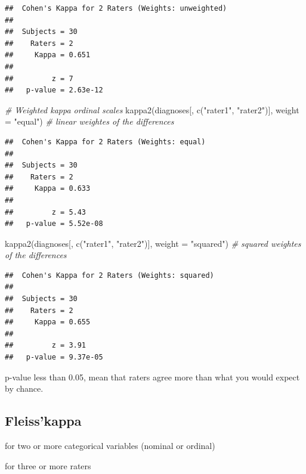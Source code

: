 \documentclass[
]{book}
\newenvironment{Shaded}{\begin{snugshade}}{\end{snugshade}}
\newcommand{\AttributeTok}[1]{\textcolor[rgb]{0.77,0.63,0.00}{#1}}
\newcommand{\CommentTok}[1]{\textcolor[rgb]{0.56,0.35,0.01}{\textit{#1}}}
\newcommand{\FunctionTok}[1]{\textcolor[rgb]{0.00,0.00,0.00}{#1}}
\newcommand{\NormalTok}[1]{#1}
\newcommand{\StringTok}[1]{\textcolor[rgb]{0.31,0.60,0.02}{#1}}
\begin{document}
\begin{verbatim}
##  Cohen's Kappa for 2 Raters (Weights: unweighted)
## 
##  Subjects = 30 
##    Raters = 2 
##     Kappa = 0.651 
## 
##         z = 7 
##   p-value = 2.63e-12
\end{verbatim}

\begin{Shaded}
\begin{Highlighting}[]
\CommentTok{\# Weighted kappa ordinal scales}
\FunctionTok{kappa2}\NormalTok{(diagnoses[, }\FunctionTok{c}\NormalTok{(}\StringTok{"rater1"}\NormalTok{, }\StringTok{"rater2"}\NormalTok{)], }\AttributeTok{weight =} \StringTok{"equal"}\NormalTok{) }\CommentTok{\# linear weightes of the differences}
\end{Highlighting}
\end{Shaded}

\begin{verbatim}
##  Cohen's Kappa for 2 Raters (Weights: equal)
## 
##  Subjects = 30 
##    Raters = 2 
##     Kappa = 0.633 
## 
##         z = 5.43 
##   p-value = 5.52e-08
\end{verbatim}

\begin{Shaded}
\begin{Highlighting}[]
\FunctionTok{kappa2}\NormalTok{(diagnoses[, }\FunctionTok{c}\NormalTok{(}\StringTok{"rater1"}\NormalTok{, }\StringTok{"rater2"}\NormalTok{)], }\AttributeTok{weight =} \StringTok{"squared"}\NormalTok{) }\CommentTok{\# squared weightes of the differences}
\end{Highlighting}
\end{Shaded}

\begin{verbatim}
##  Cohen's Kappa for 2 Raters (Weights: squared)
## 
##  Subjects = 30 
##    Raters = 2 
##     Kappa = 0.655 
## 
##         z = 3.91 
##   p-value = 9.37e-05
\end{verbatim}

p-value less than 0.05, mean that raters agree more than what you would expect by chance.

\hypertarget{fleisskappa}{%
\subsection{Fleiss'kappa}\label{fleisskappa}}

for two or more categorical variables (nominal or ordinal)

for three or more raters
\end{document}
